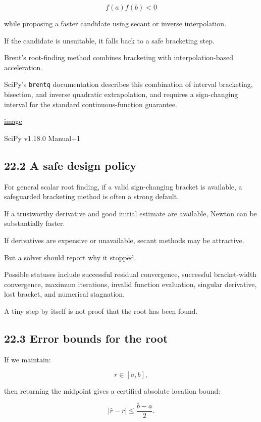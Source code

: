 \[ f(a)f(b)<0 \]

while proposing a faster candidate using secant or inverse interpolation.

If the candidate is unsuitable, it falls back to a safe bracketing step.

Brent's root-finding method combines bracketing with interpolation-based acceleration.

SciPy's \texttt{brentq} documentation describes this combination of interval bracketing, bisection, and inverse quadratic extrapolation, and requires a sign-changing interval for the standard continuous-function guarantee. 

\href{https://www.google.com/s2/favicons?domain=https://docs.scipy.org&sz=32}{image}

SciPy v1.18.0 Manual+1

\subsection{22.2 A safe design policy}\label{02-foundations-ii-ch028-a-safe-design-policy}

For general scalar root finding, if a valid sign-changing bracket is available, a safeguarded bracketing method is often a strong default.

If a trustworthy derivative and good initial estimate are available, Newton can be substantially faster.

If derivatives are expensive or unavailable, secant methods may be attractive.

But a solver should report why it stopped.

Possible statuses include successful residual convergence, successful bracket-width convergence, maximum iterations, invalid function evaluation, singular derivative, lost bracket, and numerical stagnation.

A tiny step by itself is not proof that the root has been found.

\subsection{22.3 Error bounds for the root}\label{02-foundations-ii-ch028-error-bounds-for-the-root}

If we maintain:

\[ r\in[a,b], \]

then returning the midpoint gives a certified absolute location bound:

\[ \boxed{ |\hat r-r|\le\frac{b-a}{2} }. \]

